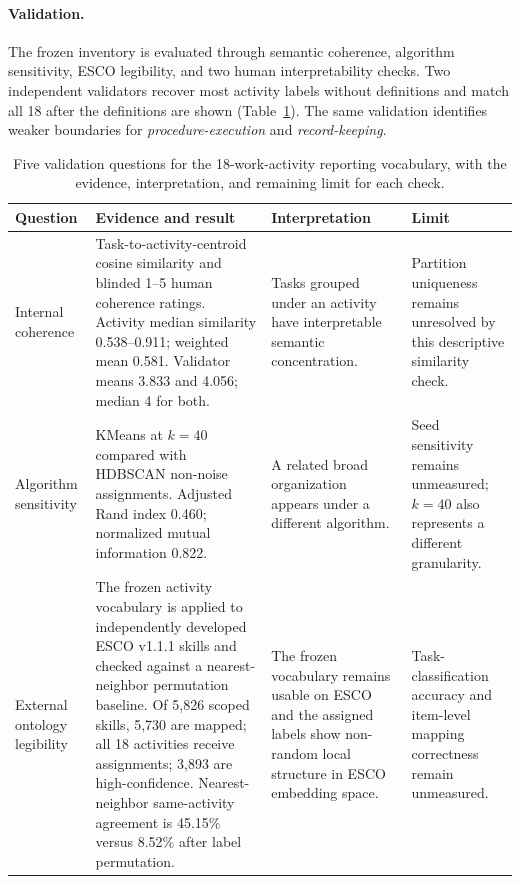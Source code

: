 \documentclass[10pt]{article}
\begin{document}
\paragraph{Validation.}
The frozen inventory is evaluated through semantic coherence, algorithm sensitivity, ESCO legibility, and two human interpretability checks. Two independent validators recover most activity labels without definitions and match all 18 after the definitions are shown (Table~\ref{tab:inventory-validation}). The same validation identifies weaker boundaries for \emph{procedure-execution} and \emph{record-keeping}.

\begin{table}[!ht]
\caption{Five validation questions for the 18-work-activity reporting vocabulary, with the evidence, interpretation, and remaining limit for each check.}
\label{tab:inventory-validation}
\centering
\footnotesize
\setlength{\tabcolsep}{4pt}
\renewcommand{\arraystretch}{1.12}
\begin{tabularx}{\textwidth}{@{}p{}p{}p{}X@{}}
\toprule
\textbf{Question} & \textbf{Evidence and result} & \textbf{Interpretation} & \textbf{Limit} \\
\midrule
Internal coherence & Task-to-activity-centroid cosine similarity and blinded 1--5 human coherence ratings. Activity median similarity 0.538--0.911; weighted mean 0.581. Validator means 3.833 and 4.056; median 4 for both. & Tasks grouped under an activity have interpretable semantic concentration. & Partition uniqueness remains unresolved by this descriptive similarity check. \\
Algorithm sensitivity & KMeans at $k=40$ compared with HDBSCAN non-noise assignments. Adjusted Rand index 0.460; normalized mutual information 0.822. & A related broad organization appears under a different algorithm. & Seed sensitivity remains unmeasured; $k=40$ also represents a different granularity. \\
External ontology legibility & The frozen activity vocabulary is applied to independently developed ESCO v1.1.1 skills and checked against a nearest-neighbor permutation baseline. Of 5{,}826 scoped skills, 5{,}730 are mapped; all 18 activities receive assignments; 3{,}893 are high-confidence. Nearest-neighbor same-activity agreement is 45.15\% versus 8.52\% after label permutation. & The frozen vocabulary remains usable on ESCO and the assigned labels show non-random local structure in ESCO embedding space. & Task-classification accuracy and item-level mapping correctness remain unmeasured. \\

\end{tabularx}
\end{table}
\end{document}
